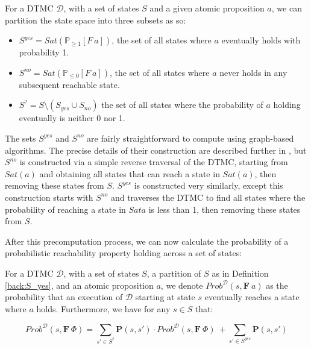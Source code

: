 \begin{definition}
\label{back:S_yes}

    For a DTMC $\mathcal{D}$, with a set of states $S$ and a given atomic proposition $a$, we can partition the state space into three subsets as so:

    \begin{itemize}
        
        \item $S^{yes} = Sat(\mathbb{P}_{\geq 1}[F \: a])$, the set of all states where $a$ eventually holds with probability 1.
        \item $S^{no} = Sat(\mathbb{P}_{\leq 0}[F \: a])$, the set of all states where $a$ never holds in any subsequent reachable state.
        \item $S^{?} = S \setminus (S_{yes} \cup S_{no})$ the set of all states where the probability of $a$ holding eventually is neither 0 nor 1.

    \end{itemize}

\end{definition}

The sets $S^{yes}$ and $S^{no}$ are fairly straightforward to compute using graph-based algorithms. The precise details of their construction are described further in \cite{kwiatkowska_stochastic_2007}, but $S^{no}$ is constructed via a simple reverse traversal of the DTMC, starting from $Sat(a)$ and obtaining all states that can reach a state in $Sat(a)$, then removing these states from $S$. $S^{yes}$ is constructed very similarly, except this construction starts with $S^{no}$ and traverses the DTMC to find all states where the probability of reaching a state in $Sat{a}$ is less than 1, then removing these states from $S$.

After this precomputation process, we can now calculate the probability of a probabilistic reachability property holding across a set of states:

\begin{definition}
\label{back:F_operator}

    For a DTMC $\mathcal{D}$, with a set of states $S$, a partition of $S$ as in Definition \ref{back:S_yes}, and an atomic proposition $a$, we denote $Prob^{\mathcal{D}}(s, \mathbf{F} \: a)$ as the probability that an execution of $\mathcal{D}$ starting at state $s$ eventually reaches a state where $a$ holds. Furthermore, we have for any $s \in S$ that:

    \begin{equation*}
        Prob^{\mathcal{D}}(s, \mathbf{F} \: \Phi) = \sum_{s' \in S^{?}} \mathbf{P}(s, s') \cdot Prob^{\mathcal{D}}(s, \mathbf{F} \: \Phi) \: + \sum_{s' \in S^{yes}} \mathbf{P}(s, s')
    \end{equation*}
    
\end{definition}

